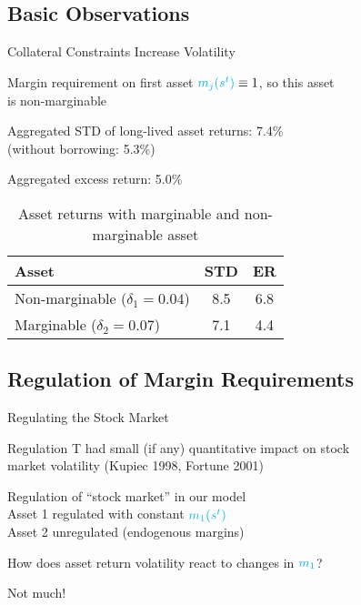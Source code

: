 \documentclass[large]{beamer}
\begin{document}
\subsection{Basic Observations}
%
\begin{frame}{Collateral Constraints Increase Volatility}

Margin requirement on first asset ${\color{cyan} m_j(s^t)} \equiv 1$, so this asset\\
\mbox{} \hspace{0.25cm} is non-marginable

\bigskip

Aggregated STD of long-lived asset returns: 7.4\%\\
\mbox{} \hspace{0.25cm} (without borrowing: 5.3\%)

\bigskip

Aggregated excess return: 5.0\%

\begin{table}[htdb]
\caption{Asset returns with marginable and non-marginable asset}
\begin{center}
\begin{tabular}{|l|c|c|}
\hline
Asset & STD & ER \\ \hline
Non-marginable ($\delta_1 = 0.04$)    &  8.5     &  6.8 \\ \hline
Marginable ($\delta_2 = 0.07$)       &  7.1     &  4.4  \\ \hline
\end{tabular}
\end{center}
\end{table}

\end{frame}
%

\subsection{Regulation of Margin Requirements}
%
\begin{frame}{Regulating the Stock Market}

Regulation T had small (if any) quantitative impact on stock\\
\mbox{} \hspace{0.25cm}  market volatility (Kupiec 1998, Fortune 2001)

\bigskip

Regulation of ``stock market'' in our model\\[5pt]
\mbox{} \hspace{0.25cm} Asset 1 regulated with constant ${\color{cyan} m_1(s^t)}$\\[5pt]
\mbox{} \hspace{0.25cm} Asset 2 unregulated (endogenous margins)

\bigskip

How does asset return volatility react to changes in ${\color{cyan} m_1}$?

\bigskip

{\color{red} Not much!}

\end{frame}
%
%
\end{document}
